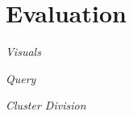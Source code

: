 \section{Evaluation}
\label{sec:evaluation}

\noindent\emph{Visuals}

\noindent\emph{Query}

\noindent\emph{Cluster Division}

